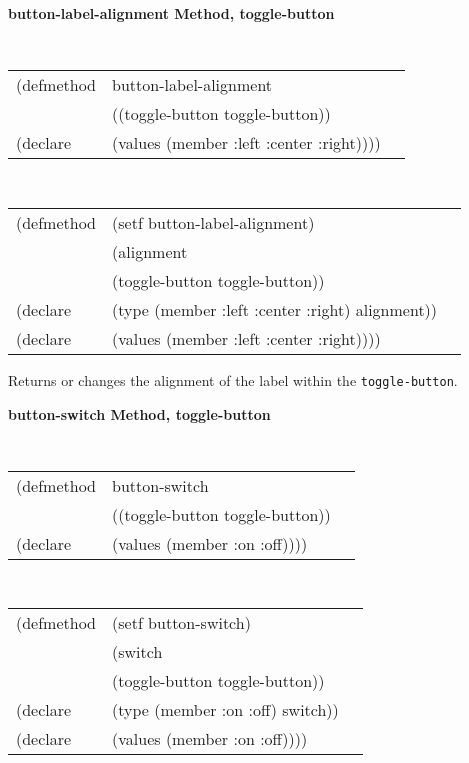 {\samepage  
{\large {\bf button-label-alignment \hfill Method, toggle-button}}
\begin{flushright} \parbox[t]{6.125in}{
\tt
\begin{tabular}{lll}
\raggedright
(defmethod & button-label-alignment & \\
& ((toggle-button  toggle-button)) \\
(declare & (values (member :left :center :right))))
\end{tabular}
\rm

}\end{flushright}}

\begin{flushright} \parbox[t]{6.125in}{
\tt
\begin{tabular}{lll}
\raggedright
(defmethod & (setf button-label-alignment) & \\
         & (alignment \\
         & (toggle-button  toggle-button)) \\
(declare &(type (member :left :center :right)  alignment))\\
(declare & (values (member :left :center :right))))
\end{tabular}
\rm}
\end{flushright}

\begin{flushright} \parbox[t]{6.125in}{
Returns or changes the alignment of the label within the {\tt toggle-button}.}
\end{flushright}


{\samepage  
{\large {\bf button-switch \hfill Method, toggle-button}}
\begin{flushright} \parbox[t]{6.125in}{
\tt
\begin{tabular}{lll}
\raggedright
(defmethod & button-switch & \\
& ((toggle-button  toggle-button)) \\
(declare & (values (member :on :off))))
\end{tabular}
\rm

}\end{flushright}}

\begin{flushright} \parbox[t]{6.125in}{
\tt
\begin{tabular}{lll}
\raggedright
(defmethod & (setf button-switch) & \\
         & (switch \\
         & (toggle-button  toggle-button)) \\
(declare &(type (member :on :off)  switch))\\
(declare & (values (member :on :off))))
\end{tabular}
\rm}
\end{flushright}

